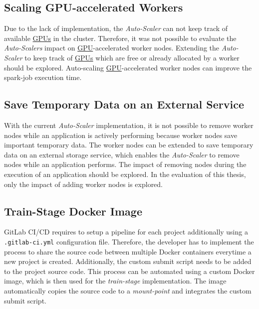 \subsection{Scaling GPU-accelerated Workers}
\label{subsec:08_outlook_gpus}
Due to the lack of implementation, the \textit{Auto-Scaler} can not keep track of available \hyperlink{abbr:gpu}{GPUs} in the cluster. Therefore, it was not possible to evaluate the \textit{Auto-Scalers} impact on \hyperlink{abbr:gpu}{GPU}-accelerated worker nodes.
Extending the \textit{Auto-Scaler} to keep track of \hyperlink{abbr:gpu}{GPUs} which are free or already allocated by a worker should be explored.
%
Auto-scaling \hyperlink{abbr:gpu}{GPU}-accelerated worker nodes can improve the spark-job execution time.


\subsection{Save Temporary Data on an External Service}
With the current \textit{Auto-Scaler} implementation, it is not possible to remove worker nodes while an application is actively performing because worker nodes save important temporary data.
The worker nodes can be extended to save temporary data on an external storage service, which enables the \textit{Auto-Scaler} to remove nodes while an application performs.
% 
The impact of removing nodes during the execution of an application should be explored. In the evaluation of this thesis, only the impact of adding worker nodes is explored.


\subsection{Train-Stage Docker Image}
GitLab CI/CD requires to setup a pipeline for each project additionally using a \texttt{.gitlab-ci.yml} configuration file.
Therefore, the developer has to implement the process to share the source code between multiple Docker containers everytime a new project is created. Additionally, the custom submit script needs to be added to the project source code.
This process can be automated using a custom Docker image, which is then used for the \textit{train-stage} implementation. The image automatically copies the source code to a \textit{mount-point} and integrates the custom submit script.